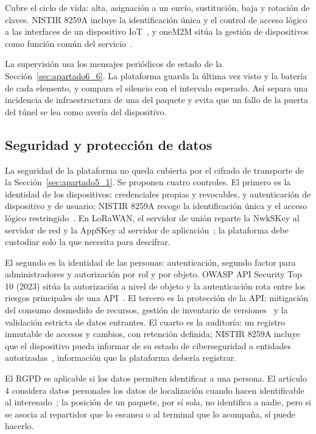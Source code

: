 \documentclass[11pt,a4paper]{article}
\begin{document}
Cubre el ciclo de vida: alta, asignación a un envío, sustitución, baja y rotación de claves. NISTIR 8259A incluye la identificación única y el control de acceso lógico a las interfaces de un dispositivo IoT~\cite{ref49}, y oneM2M sitúa la gestión de dispositivos como función común del servicio~\cite{ref42}.

La supervisión usa los mensajes periódicos de estado de la Sección~\ref{sec:apartado6_6}. La plataforma guarda la última vez visto y la batería de cada elemento, y compara el silencio con el intervalo esperado. Así separa una incidencia de infraestructura de una del paquete y evita que un fallo de la puerta del túnel se lea como avería del dispositivo.

\subsection{Seguridad y protección de datos}
\label{sec:apartado7_6}

La seguridad de la plataforma no queda cubierta por el cifrado de transporte de la Sección~\ref{sec:apartado5_1}. Se proponen cuatro controles. El primero es la identidad de los dispositivos: credenciales propias y revocables, y autenticación de dispositivo y de usuario; NISTIR 8259A recoge la identificación única y el acceso lógico restringido~\cite{ref49}. En LoRaWAN, el servidor de unión reparte la NwkSKey al servidor de red y la AppSKey al servidor de aplicación~\cite{ref24,ref35}; la plataforma debe custodiar solo la que necesita para descifrar.

El segundo es la identidad de las personas: autenticación, segundo factor para administradores y autorización por rol y por objeto. OWASP API Security Top 10 (2023) sitúa la autorización a nivel de objeto y la autenticación rota entre los riesgos principales de una API~\cite{ref48}. El tercero es la protección de la API: mitigación del consumo desmedido de recursos, gestión de inventario de versiones~\cite{ref48} y la validación estricta de datos entrantes. El cuarto es la auditoría: un registro inmutable de accesos y cambios, con retención definida; NISTIR 8259A incluye que el dispositivo pueda informar de su estado de ciberseguridad a entidades autorizadas~\cite{ref49}, información que la plataforma debería registrar.

El RGPD es aplicable si los datos permiten identificar a una persona. El artículo 4 considera datos personales los datos de localización cuando hacen identificable al interesado~\cite{ref45}; la posición de un paquete, por sí sola, no identifica a nadie, pero si se asocia al repartidor que lo escanea o al terminal que lo acompaña, sí puede hacerlo.
\end{document}
